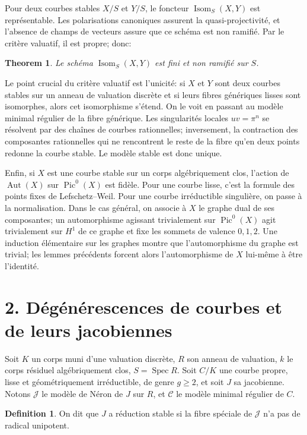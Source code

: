 \documentclass[11pt]{article}
\DeclareMathOperator{\Spec}{Spec}
\DeclareMathOperator{\Pic}{Pic}
\DeclareMathOperator{\Aut}{Aut}
\DeclareMathOperator{\Isom}{Isom}
\theoremstyle{plain}
\newtheorem*{theorem*}{Theorem}
\theoremstyle{definition}
\newtheorem*{definition*}{Definition}
\theoremstyle{remark}
\begin{document}
Pour deux courbes stables \(X/S\) et \(Y/S\), le foncteur \(\Isom_S(X,Y)\) est représentable. Les polarisations canoniques assurent la quasi-projectivité, et l'absence de champs de vecteurs assure que ce schéma est non ramifié. Par le critère valuatif, il est propre; donc:

\begin{theorem*}
Le schéma \(\Isom_S(X,Y)\) est fini et non ramifié sur \(S\).
\end{theorem*}

Le point crucial du critère valuatif est l'unicité: si \(X\) et \(Y\) sont deux courbes stables sur un anneau de valuation discrète et si leurs fibres génériques lisses sont isomorphes, alors cet isomorphisme s'étend. On le voit en passant au modèle minimal régulier de la fibre générique. Les singularités locales \(uv=\pi^n\) se résolvent par des chaînes de courbes rationnelles; inversement, la contraction des composantes rationnelles qui ne rencontrent le reste de la fibre qu'en deux points redonne la courbe stable. Le modèle stable est donc unique.

Enfin, si \(X\) est une courbe stable sur un corps algébriquement clos, l'action de \(\Aut(X)\) sur \(\Pic^0(X)\) est fidèle. Pour une courbe lisse, c'est la formule des points fixes de Lefschetz--Weil. Pour une courbe irréductible singulière, on passe à la normalisation. Dans le cas général, on associe à \(X\) le graphe dual de ses composantes; un automorphisme agissant trivialement sur \(\Pic^0(X)\) agit trivialement sur \(H^1\) de ce graphe et fixe les sommets de valence \(0,1,2\). Une induction élémentaire sur les graphes montre que l'automorphisme du graphe est trivial; les lemmes précédents forcent alors l'automorphisme de \(X\) lui-même à être l'identité.

\section*{2. Dégénérescences de courbes et de leurs jacobiennes}

Soit \(K\) un corps muni d'une valuation discrète, \(R\) son anneau de valuation, \(k\) le corps résiduel algébriquement clos, \(S=\Spec R\). Soit \(C/K\) une courbe propre, lisse et géométriquement irréductible, de genre \(g\geq 2\), et soit \(J\) sa jacobienne. Notons \(\mathcal J\) le modèle de Néron de \(J\) sur \(R\), et \(\mathcal C\) le modèle minimal régulier de \(C\).

\begin{definition*}
On dit que \(J\) a réduction stable si la fibre spéciale de \(\mathcal J\) n'a pas de radical unipotent.
\end{definition*}
\end{document}
